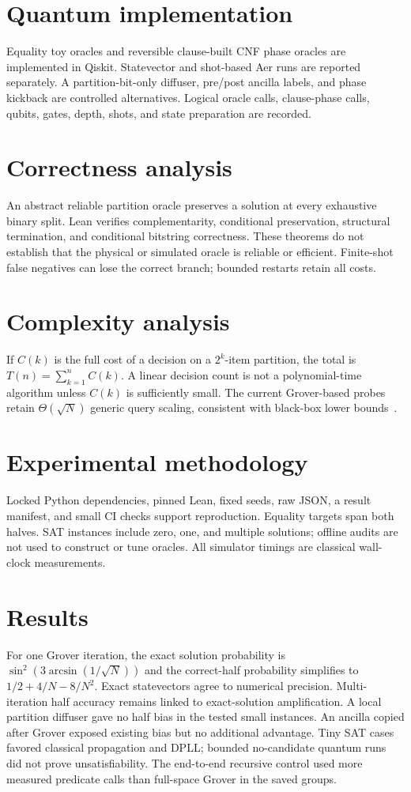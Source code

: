 \documentclass[11pt]{article}
\begin{document}
\section{Quantum implementation}
Equality toy oracles and reversible clause-built CNF phase oracles are implemented in Qiskit. Statevector and shot-based Aer runs are reported separately. A partition-bit-only diffuser, pre/post ancilla labels, and phase kickback are controlled alternatives. Logical oracle calls, clause-phase calls, qubits, gates, depth, shots, and state preparation are recorded.

\section{Correctness analysis}
An abstract reliable partition oracle preserves a solution at every exhaustive binary split. Lean verifies complementarity, conditional preservation, structural termination, and conditional bitstring correctness. These theorems do not establish that the physical or simulated oracle is reliable or efficient. Finite-shot false negatives can lose the correct branch; bounded restarts retain all costs.

\section{Complexity analysis}
If $C(k)$ is the full cost of a decision on a $2^k$-item partition, the total is $T(n)=\sum_{k=1}^{n}C(k)$. A linear decision count is not a polynomial-time algorithm unless $C(k)$ is sufficiently small. The current Grover-based probes retain $\Theta(\sqrt N)$ generic query scaling, consistent with black-box lower bounds~\cite{bbbv1997,zalka1999}.

\section{Experimental methodology}
Locked Python dependencies, pinned Lean, fixed seeds, raw JSON, a result manifest, and small CI checks support reproduction. Equality targets span both halves. SAT instances include zero, one, and multiple solutions; offline audits are not used to construct or tune oracles. All simulator timings are classical wall-clock measurements.

\section{Results}
For one Grover iteration, the exact solution probability is $\sin^2(3\arcsin(1/\sqrt N))$ and the correct-half probability simplifies to $1/2+4/N-8/N^2$. Exact statevectors agree to numerical precision. Multi-iteration half accuracy remains linked to exact-solution amplification. A local partition diffuser gave no half bias in the tested small instances. An ancilla copied after Grover exposed existing bias but no additional advantage. Tiny SAT cases favored classical propagation and DPLL; bounded no-candidate quantum runs did not prove unsatisfiability. The end-to-end recursive control used more measured predicate calls than full-space Grover in the saved groups.
\end{document}
